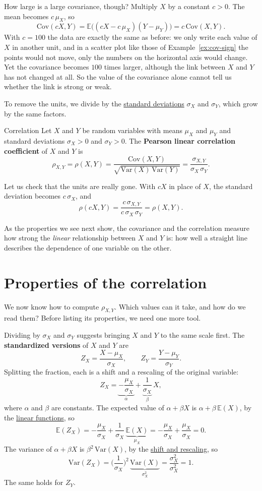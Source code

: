\documentclass[a4paper,12pt,oneside]{report}
\begin{document}
How large is a large covariance, though? Multiply $X$ by a constant
$c>0$. The mean becomes $c\,\mu_X$, so
\[
\mathrm{Cov}(cX,Y)=\mathbb{E}\big((cX-c\,\mu_X)(Y-\mu_Y)\big)=c\,\mathrm{Cov}(X,Y).
\]
With $c=100$ the data are exactly the same as before: we only write each
value of $X$ in another unit, and in a scatter plot like those of
Example~\ref{ex:cov-sign} the points would not move, only the numbers on
the horizontal axis would change. Yet the covariance becomes $100$ times
larger, although the link between $X$ and $Y$ has not changed at all. So
the value of the covariance alone cannot tell us whether the link is
strong or weak.

To remove the units, we divide by the
\hyperref[def:sd]{standard deviations} $\sigma_X$ and $\sigma_Y$, which
grow by the same factors.

\begin{frameddefn}{Correlation}\label{def:correlation}
Let $X$ and $Y$ be random variables with means $\mu_X$ and $\mu_Y$ and
standard deviations $\sigma_X>0$ and $\sigma_Y>0$. The \textbf{Pearson
linear correlation coefficient} of $X$ and $Y$ is
\[
\rho_{X,Y}=\rho(X,Y)=\frac{\mathrm{Cov}(X,Y)}{\sqrt{\mathrm{Var}(X)\,\mathrm{Var}(Y)}}
=\frac{\sigma_{X,Y}}{\sigma_X\,\sigma_Y}.
\]
\end{frameddefn}

Let us check that the units are really gone. With $cX$ in place of $X$,
the standard deviation becomes $c\,\sigma_X$, and
\[
\rho(cX,Y)=\frac{c\,\sigma_{X,Y}}{c\,\sigma_X\,\sigma_Y}=\rho(X,Y).
\]

As the properties we see next show, the covariance and the
correlation measure how strong the \emph{linear} relationship between $X$
and $Y$ is: how well a straight line describes the dependence of one
variable on the other.

\section{Properties of the correlation}\label{sec:corr-properties}

We now know how to compute $\rho_{X,Y}$. Which values can it take, and how
do we read them? Before listing its properties, we need one more tool.

Dividing by $\sigma_X$ and $\sigma_Y$ suggests bringing $X$ and $Y$ to the
same scale first. The \textbf{standardized versions} of $X$ and $Y$ are
\[
Z_X=\frac{X-\mu_X}{\sigma_X},\qquad Z_Y=\frac{Y-\mu_Y}{\sigma_Y}.
\]
Splitting the fraction, each is a shift and a rescaling of the original
variable:
\[
Z_X=\underbrace{-\frac{\mu_X}{\sigma_X}}_{\alpha}+\underbrace{\frac{1}{\sigma_X}}_{\beta}\,X ,
\]
where $\alpha$ and $\beta$ are constants. The expected value of
$\alpha+\beta X$ is $\alpha+\beta\,\mathbb{E}(X)$, by the
\hyperref[prop:linear]{linear functions}, so
\[
\mathbb{E}(Z_X)=-\frac{\mu_X}{\sigma_X}+\frac{1}{\sigma_X}\,\underbrace{\mathbb{E}(X)}_{\mu_X}
=-\frac{\mu_X}{\sigma_X}+\frac{\mu_X}{\sigma_X}=0 .
\]
The variance of $\alpha+\beta X$ is $\beta^2\,\mathrm{Var}(X)$, by the
\hyperref[var-affine]{shift and rescaling}, so
\[
\mathrm{Var}(Z_X)=\Big(\frac{1}{\sigma_X}\Big)^2\,\underbrace{\mathrm{Var}(X)}_{\sigma_X^2}
=\frac{\sigma_X^2}{\sigma_X^2}=1 .
\]
The same holds for $Z_Y$.
\end{document}
